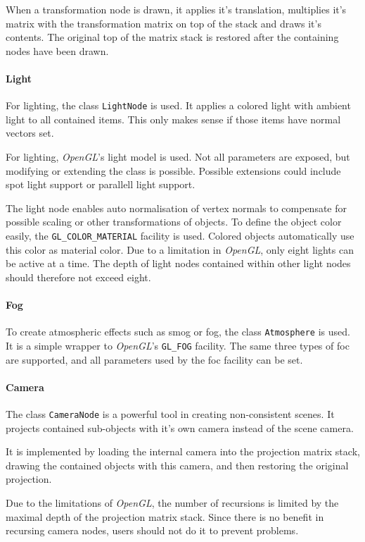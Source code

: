 When a transformation node is drawn, it applies it's translation, multiplies it's matrix with the transformation matrix on top of the stack and draws it's contents.
The original top of the matrix stack is restored after the containing nodes have been drawn.

\paragraph{Light}
For lighting, the class \lstinline{LightNode} is used.
It applies a colored light with ambient light to all contained items.
This only makes sense if those items have normal vectors set.

For lighting, \textit{OpenGL}'s light model is used.
Not all parameters are exposed, but modifying or extending the class is possible.
Possible extensions could include spot light support or parallell light support.

The light node enables auto normalisation of vertex normals to compensate for possible scaling or other transformations of objects.
To define the object color easily, the \lstinline{GL_COLOR_MATERIAL} facility is used.
Colored objects automatically use this color as material color.
Due to a limitation in \textit{OpenGL}, only eight lights can be active at a time.
The depth of light nodes contained within other light nodes should therefore not exceed eight.

\paragraph{Fog}
To create atmospheric effects such as smog or fog, the class \lstinline{Atmosphere} is used.
It is a simple wrapper to \textit{OpenGL}'s \lstinline{GL_FOG} facility.
The same three types of foc are supported, and all parameters used by the foc facility can be set.

\paragraph{Camera}
The class \lstinline{CameraNode} is a powerful tool in creating non-consistent scenes.
It projects contained sub-objects with it's own camera instead of the scene camera.

It is implemented by loading the internal camera into the projection matrix stack, drawing the contained objects with this camera, and then restoring the original projection.

Due to the limitations of \textit{OpenGL}, the number of recursions is limited by the maximal depth of the projection matrix stack.
Since there is no benefit in recursing camera nodes, users should not do it to prevent problems.

